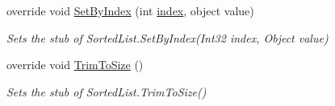 \begin{DoxyCompactItemize}
override void \hyperlink{class_system_1_1_collections_1_1_fakes_1_1_stub_sorted_list_a2cdbfbfb5ca3bd3a8e26012891a85751}{Set\-By\-Index} (int \hyperlink{jquery-1_810_82-vsdoc_8js_a75bb12d1f23302a9eea93a6d89d0193e}{index}, object value)
\begin{DoxyCompactList}\small\item\em Sets the stub of Sorted\-List.\-Set\-By\-Index(\-Int32 index, Object value)\end{DoxyCompactList}\item 
override void \hyperlink{class_system_1_1_collections_1_1_fakes_1_1_stub_sorted_list_adba34210226064f6cd32a36ec2989c2d}{Trim\-To\-Size} ()
\begin{DoxyCompactList}\small\item\em Sets the stub of Sorted\-List.\-Trim\-To\-Size()\end{DoxyCompactList}\end{DoxyCompactItemize}
